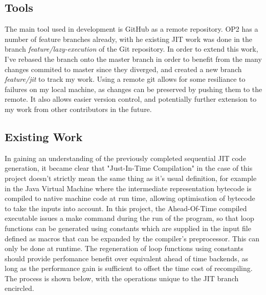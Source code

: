 \documentclass[11pt]{article}
\begin{document}
\subsection*{Tools}
The main tool used in development is GitHub as a remote repository. OP2 has a number of feature branches already, with he existing JIT work was done in the branch \textit{feature/lazy-execution} of the Git repository. In order to extend this work, I've rebased the branch onto the master branch in order to benefit from the many changes commited to master since they diverged, and created a new branch \textit{feature/jit} to track my work. Using a remote git allows for some resiliance to failures on my local machine, as changes can be preserved by pushing them to the remote. It also allows easier version control, and potentially further extension to my work from other contributors in the future.
\subsection*{Existing Work}
 In gaining an understanding of the previously completed sequential JIT code generation, it became clear that "Just-In-Time Compilation" in the case of this project doesn't strictly mean the same thing as it's usual definition, for example in the Java Virtual Machine where the intermediate representation bytecode is compiled to native machine code at run time, allowing optimisation of bytecode to take the inputs into account. In this project, the Ahead-Of-Time compiled executable issues a make command during the run of the program, so that loop functions can be generated using constants which are supplied in the input file defined as macros that can be expanded by the compiler's preprocessor. This can only be done at runtime. The regeneration of loop functions using constants should provide perfomance benefit over equivalent ahead of time backends, as long as the performance gain is sufficient to offset the time cost of recompiling. The process is shown below, with the operations unique to the JIT branch encircled.
\end{document}
